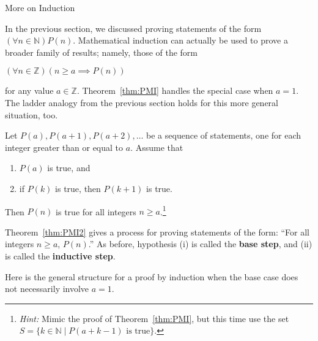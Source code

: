 \begin{section}{More on Induction}

In the previous section, we discussed proving statements of the form $(\forall n \in \mathbb{N}) P(n)$. Mathematical induction can actually be used to prove a broader family of results; namely, those of the form
\begin{center}
$(\forall n \in \mathbb{Z})(n \geq a \implies P(n))$
\end{center}
for any value $a \in \mathbb{Z}$. Theorem~\ref{thm:PMI} handles the special case when $a = 1$.  The ladder analogy from the previous section holds for this more general situation, too.

\begin{theorem}\label{thm:PMI2}
Let $P(a), P(a+1), P(a+2), \ldots$ be a sequence of statements, one for each integer greater than or equal to $a$. Assume that
\begin{enumerate}[label=\textrm{(\roman*)}]
\item $P(a)$ is true, and
\item if $P(k)$ is true, then $P(k+1)$ is true.
\end{enumerate}
Then $P(n)$ is true for all integers $n \geq a$.\footnote{\emph{Hint:} Mimic the proof of Theorem~\ref{thm:PMI}, but this time use the set $S=\{k\in \mathbb{N}\mid P(a+k-1) \text{ is true}\}$.}
\end{theorem}

Theorem~\ref{thm:PMI2} gives a process for proving statements of the form: ``For all integers $n\geq a$, $P(n)$.'' As before, hypothesis (i) is called the \textbf{base step}, and (ii) is called the \textbf{inductive step}.

\begin{skeleton}
Here is the general structure for a proof by induction when the base case does not necessarily involve $a=1$.

\begin{center}
\end{center}
\end{skeleton}
\end{section}
